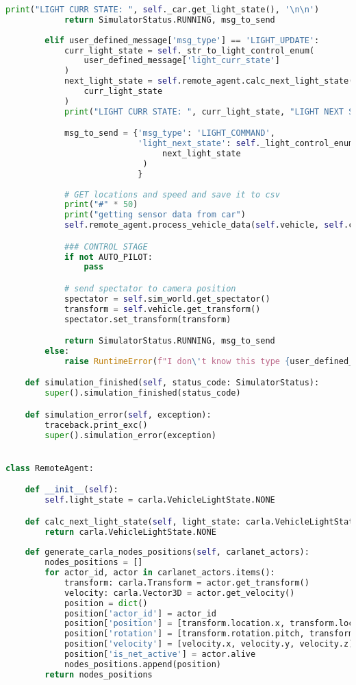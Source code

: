 \begin{lstlisting}[language=Python, caption={Simple data collection example, now using network simulation capabilities.},label={code:network}]
            print("LIGHT CURR STATE: ", self._car.get_light_state(), '\n\n')
            return SimulatorStatus.RUNNING, msg_to_send
        
        elif user_defined_message['msg_type'] == 'LIGHT_UPDATE':
            curr_light_state = self._str_to_light_control_enum(
                user_defined_message['light_curr_state']
            )
            next_light_state = self.remote_agent.calc_next_light_state(
                curr_light_state
            )
            print("LIGHT CURR STATE: ", curr_light_state, "LIGHT NEXT STATE: ", next_light_state, '\n')

            msg_to_send = {'msg_type': 'LIGHT_COMMAND',
                           'light_next_state': self._light_control_enum_to_str(
                                next_light_state
                            )
                           }
            
            # GET locations and speed and save it to csv
            print("#" * 50)
            print("getting sensor data from car")
            self.remote_agent.process_vehicle_data(self.vehicle, self.carlanet_actors)

            ### CONTROL STAGE
            if not AUTO_PILOT:
                pass

            # send spectator to camera position
            spectator = self.sim_world.get_spectator()
            transform = self.vehicle.get_transform()
            spectator.set_transform(transform)

            return SimulatorStatus.RUNNING, msg_to_send
        else:
            raise RuntimeError(f"I don\'t know this type {user_defined_message['msg_type']}")

    def simulation_finished(self, status_code: SimulatorStatus):
        super().simulation_finished(status_code)

    def simulation_error(self, exception):
        traceback.print_exc()
        super().simulation_error(exception)


class RemoteAgent:

    def __init__(self):
        self.light_state = carla.VehicleLightState.NONE

    def calc_next_light_state(self, light_state: carla.VehicleLightState):
        return carla.VehicleLightState.NONE
    
    def generate_carla_nodes_positions(self, carlanet_actors):
        nodes_positions = []
        for actor_id, actor in carlanet_actors.items():
            transform: carla.Transform = actor.get_transform()
            velocity: carla.Vector3D = actor.get_velocity()
            position = dict()
            position['actor_id'] = actor_id
            position['position'] = [transform.location.x, transform.location.y, transform.location.z]
            position['rotation'] = [transform.rotation.pitch, transform.rotation.yaw, transform.rotation.roll]
            position['velocity'] = [velocity.x, velocity.y, velocity.z]
            position['is_net_active'] = actor.alive
            nodes_positions.append(position)
        return nodes_positions


\end{lstlisting}
